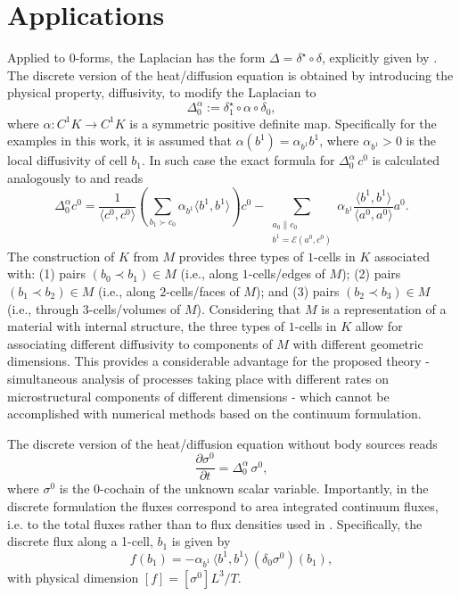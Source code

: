 \documentclass{elsarticle}
\theoremstyle{definition}
\newcommand{\inner}[2]{\langle#1,#2\rangle}
\begin{document}
\section{Applications}
\label{sec:applications}
Applied to $0$-forms, the Laplacian has the form $\Delta = \delta^{\star} \circ \delta$, explicitly given by . The discrete version of the heat/diffusion equation is obtained by introducing the physical property, diffusivity, to modify the Laplacian to
\begin{equation}
\label{eq:mod_laplacian}
  \Delta_0^\alpha := \delta^\star_1 \circ \alpha \circ \delta_0,
\end{equation}
where $\alpha \colon C^1 K \to C^1 K$ is a symmetric positive definite map. Specifically for the examples in this work, it is assumed that $\alpha(b^1) = \alpha_{b^1} b^1$, where $\alpha_{b^1} > 0$ is the local diffusivity of cell $b_1$. In such case the exact formula for $\Delta_0^\alpha\, c^0$ is calculated analogously to  and reads
\begin{equation}
  \Delta_0^\alpha c^0 = 
    \frac{1}{\inner{c^0}{c^0}} \left(\sum_{b_1 \succ c_0} \alpha_{b^1} \inner{b^1}{b^1} \right) c^0 
      - \sum_{\substack{a_0 \parallel c_0 \\ b^1 = \mathcal{E}(a^0, c^0)}} \alpha_{b^1} \frac{\inner{b^1}{b^1}}{\inner{a^0}{a^0}} a^0.
\end{equation}
The construction of $K$ from $M$ provides three types of $1$-cells in $K$ associated with: (1) pairs $(b_0 \prec b_1) \in M$ (i.e., along $1$-cells/edges of $M$); (2) pairs $(b_1 \prec b_2) \in M$ (i.e., along $2$-cells/faces of $M$); and (3) pairs $(b_2 \prec b_3) \in M$ (i.e., through $3$-cells/volumes of $M$). Considering that $M$ is a representation of a material with internal structure, the three types of $1$-cells in $K$ allow for associating different diffusivity to components of $M$ with different geometric dimensions. This provides a considerable advantage for the proposed theory - simultaneous analysis of processes taking place with different rates on microstructural components of different dimensions - which cannot be accomplished with numerical methods based on the continuum formulation.

The discrete version of the heat/diffusion equation without body sources reads
\begin{equation}
\label{eq:heat_discrete}
  \frac{\partial \sigma^0}{\partial t} = \Delta_0^\alpha\, \sigma^0,
\end{equation}
where $\sigma^0$ is the $0$-cochain of the unknown scalar variable. Importantly, in the discrete formulation the fluxes correspond to area integrated continuum fluxes, i.e. to the total fluxes rather than to flux densities used in . Specifically, the discrete flux along a 1-cell, $b_1$ is given by 
\begin{equation}
\label{eq:flux_discrete}
    f(b_1) = -\alpha_{b^1}\, \inner{b^1}{b^1}\, (\delta_0 \sigma^0)(b_1),
\end{equation}
with physical dimension $[f]=[\sigma^0]L^3/T$.
\end{document}
